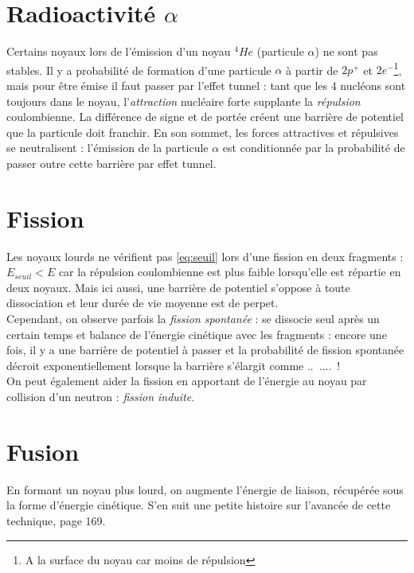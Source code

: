 \documentclass	[11pt, a4paper, openany]{book}
\begin{document}
		\section{Radioactivité $\alpha$}
		Certains noyaux lors de l'émission d'un noyau $^4He$ (particule $\alpha$) ne sont pas stables. Il 
		y a probabilité de formation d'une particule $\alpha$ à partir  de $2 p^+$ et $2 e^-$\footnote{A la 
		surface du noyau car moins de répulsion}, mais pour être émise il faut passer par l'effet tunnel : 
		tant que les 4 nucléons sont toujours dans le noyau, l'\textit{attraction} nucléaire forte supplante 
		la \textit{répulsion} coulombienne. La différence de signe et de portée créent une barrière de 
		potentiel que la particule doit franchir. En son sommet, les forces attractives et répulsives se 
		neutralisent : l'émission de la particule $\alpha$ est conditionnée par la probabilité de passer outre
		cette barrière par effet tunnel.
		
		\section{Fission}
		Les noyaux lourds ne vérifient pas \autoref{eq:seuil} lors d'une fission en deux fragments : $E_{
		seuil} < E$ car la répulsion coulombienne est plus faible lorsqu'elle est répartie en deux noyaux.
		Mais ici aussi, une barrière de potentiel s'oppose à toute dissociation et leur durée de vie moyenne
		est de perpet.\\
		
		Cependant, on observe parfois la \textit{fission spontanée} : se dissocie seul après un certain temps
		et balance de l'énergie cinétique avec les fragments : encore une fois, il y a une barrière de 
		potentiel à passer et la probabilité de fission spontanée décroit exponentiellement lorsque la 
		barrière s'élargit comme ..\ ....\ !\\
		On peut également aider la fission en apportant de l'énergie au noyau par collision d'un neutron : 
		\textit{fission induite}.
		
		
		\section{Fusion}
		En formant un noyau plus lourd, on augmente l'énergie de liaison, récupérée sous la forme d'énergie
		cinétique. S'en suit une petite histoire sur l'avancée de cette technique, page 169.
		
		
		
		
		
\end{document}
